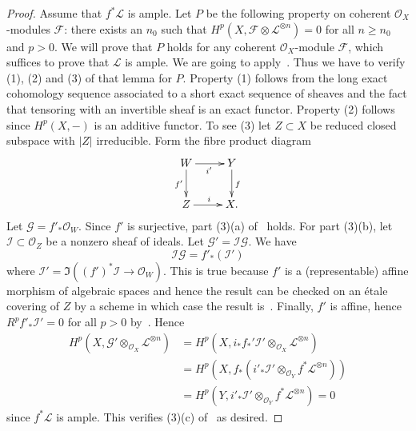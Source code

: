 \begin{proof}
\medskip\noindent
Assume that $f^*\mathcal{L}$ is ample.
Let $P$ be the following property on coherent $\mathcal{O}_X$-modules
$\mathcal{F}$:
there exists an $n_0$ such that $H^p(X, \mathcal{F} \otimes
\mathcal{L}^{\otimes n}) = 0$ for all $n \geq n_0$ and $p > 0$.
We will prove that $P$ holds for any coherent $\mathcal{O}_X$-module
$\mathcal{F}$, which suffices to prove that $\mathcal{L}$ is ample.
We are going to apply~.
Thus we have to verify (1), (2) and (3) of that lemma for $P$.
Property (1) follows from the long exact cohomology sequence associated
to a short exact sequence of sheaves and the fact that tensoring with
an invertible sheaf is an exact functor.
Property (2) follows since $H^p(X, -)$ is an additive functor.
To see (3) let $Z \subset X$ be reduced closed subspace with $|Z|$
irreducible.
Form the fibre product diagram
$$
\xymatrix{
  W \ar[r]_{i'} \ar[d]_{f'} & Y \ar[d]^{f} \\
  Z \ar[r]^{i} & X.
}
$$
Let $\mathcal{G} = f'_*\mathcal{O}_W$.
Since $f'$ is surjective, part (3)(a) of~ holds.
For part (3)(b), let $\mathcal{I} \subset \mathcal{O}_Z$ be a nonzero sheaf
of ideals.
Let $\mathcal{G}' = \mathcal{I}\mathcal{G}$.
We have
$$
\mathcal{I} \mathcal{G} = f'_*(\mathcal{I}')
$$
where $\mathcal{I}' = \Im((f')^*\mathcal{I} \to \mathcal{O}_W)$.
This is true because $f'$ is a (representable) affine morphism of
algebraic spaces and hence the result can be checked on an \'etale
covering of $Z$ by a scheme in which case the result is~.
Finally, $f'$ is affine, hence $R^pf'_*\mathcal{I}' = 0$ for all $p > 0$
by~.
Hence
\begin{align*}
H^p(X, \mathcal{G}' \otimes_{\mathcal{O}_X} \mathcal{L}^{\otimes n})
  & = H^p(X, i_*f_*'\mathcal{I}' \otimes_{\mathcal{O}_X} \mathcal{L}^{\otimes n}) \\
  & = H^p(X, f_*(i'_*\mathcal{I}' \otimes_{\mathcal{O}_Y} f^*\mathcal{L}^{\otimes n})) \\
  & = H^p(Y, i'_*\mathcal{I}' \otimes_{\mathcal{O}_Y} f^*\mathcal{L}^{\otimes n}) = 0
\end{align*}
since $f^*\mathcal{L}$ is ample.
This verifies (3)(c) of~ as desired.
\end{proof}

